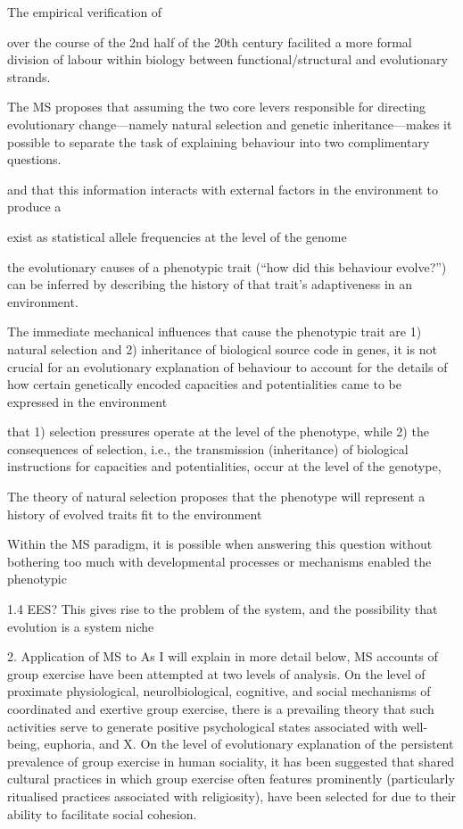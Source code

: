 The empirical verification of


over the course of the 2nd half of the 20th century facilited a more formal division of labour within biology between functional/structural and evolutionary strands.




The MS proposes that assuming the two core levers responsible for directing evolutionary change---namely natural selection and genetic inheritance---makes it possible to separate the task of explaining behaviour into two complimentary questions.


and that this information interacts with external factors in the environment to produce a


exist as statistical allele frequencies at the level of the genome


the evolutionary causes of a phenotypic trait (``how did this behaviour evolve?'') can be inferred by describing the history of that trait's adaptiveness in an environment.

The immediate mechanical influences that cause the phenotypic trait are 1) natural selection and 2) inheritance of biological source code in genes, it is not crucial for an evolutionary explanation of behaviour to account for the details of how certain genetically encoded capacities and potentialities came to be expressed in the environment

 that 1) selection pressures operate at the level of the phenotype, while 2) the consequences of selection, i.e., the transmission (inheritance) of biological instructions for capacities and potentialities, occur at the level of the genotype,

The theory of natural selection proposes that the phenotype will represent a history of evolved traits fit to the environment

Within the MS paradigm, it is possible when answering this question without bothering too much with developmental processes or mechanisms enabled the phenotypic



1.4  EES?
This gives rise to the problem of the system, and the possibility that evolution is a system niche


2. Application of MS to
As I will explain in more detail below, MS accounts of group exercise have been attempted at two levels of analysis.  On the level of proximate physiological, neurolbiological, cognitive, and social mechanisms of coordinated and exertive group exercise, there is a prevailing theory that such activities serve to generate positive psychological states associated with well-being, euphoria, and X. On the level of evolutionary explanation of the persistent prevalence of group exercise in human sociality, it has been suggested that shared cultural practices in which group exercise often features prominently (particularly ritualised practices associated with religiosity), have been selected for  due to their ability to facilitate social cohesion.

